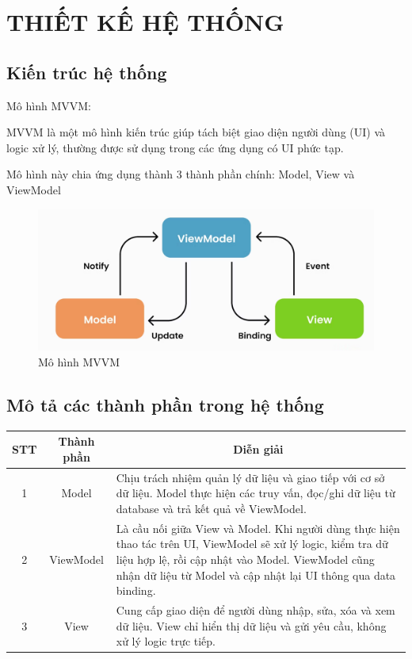 \documentclass[a4paper]{article}
\begin{document}
								
							
		

\section{THIẾT KẾ HỆ THỐNG}
	\subsection{Kiến trúc hệ thống}
	Mô hình MVVM:
	
	MVVM là một mô hình kiến trúc giúp tách biệt giao diện người dùng (UI) và logic xử lý, thường được sử dụng trong các ứng dụng có UI phức tạp. 
	
	Mô hình này chia ứng dụng thành 3 thành phần chính: Model, View và ViewModel
	
	\begin{figure}[H]
    \centering
    \includegraphics[width=1\textwidth]{mvvm} %
    \caption{Mô hình MVVM}
\end{figure}


	\subsection{Mô tả các thành phần trong hệ thống}
\begin{table}[H]
\centering
\renewcommand{\arraystretch}{1.5}
\setlength{\tabcolsep}{12pt}
\begin{tabular}{|c|c|p{10cm}|}
\hline
\textbf{STT} & \textbf{Thành phần} & \multicolumn{1}{|c|}{\textbf{Diễn giải}} \\
\hline
1 & Model & Chịu trách nhiệm quản lý dữ liệu và giao tiếp với cơ sở dữ liệu. Model thực hiện các truy vấn, đọc/ghi dữ liệu từ database và trả kết quả về ViewModel. \\

\hline
2 & ViewModel & Là cầu nối giữa View và Model. Khi người dùng thực hiện thao tác trên UI, ViewModel sẽ xử lý logic, kiểm tra dữ liệu hợp lệ, rồi cập nhật vào Model. ViewModel cũng nhận dữ liệu từ Model và cập nhật lại UI thông qua data binding.\\
\hline
3 & View & Cung cấp giao diện để người dùng nhập, sửa, xóa và xem dữ liệu. View chỉ hiển thị dữ liệu và gửi yêu cầu, không xử lý logic trực tiếp. \\
\hline
\end{tabular}
\end{table}
\end{document}
